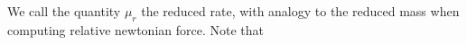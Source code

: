 We call the quantity \(\mu_r\) the reduced rate, with analogy to the reduced mass when computing relative newtonian force.  Note that